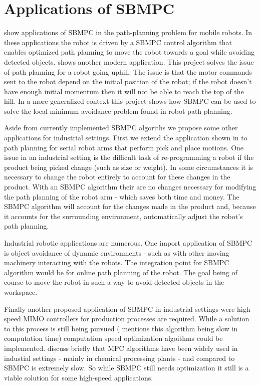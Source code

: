 \documentclass[main.tex]{subfile}
\begin{document}
\section{Applications of SBMPC} 
\label{sec:applications_of_sbmpc}

\cite{autoVehicle,auv} show applications of SBMPC in the path-planning problem
for mobile robots. In these applications the robot is driven by a SBMPC control
algorithm that enables optimized path planning to move the robot towards a goal
while avoiding detected objects. \cite{uphill} shows another modern application.
This project solves the issue of path planning for a robot going uphill. The
issue is that the motor commands sent to the robot depend on the initial
position of the robot; if the robot doesn't have enough initial momentum then it
will not be able to reach the top of the hill. In a more generalized context
this project shows how SBMPC can be used to solve the local minimum avoidance
problem found in robot path planning.

Aside from currently implemented SBMPC algoriths we propose some other
applications for industrial settings. First we extend the application shown in
\cite{uphill} to path planning for serial robot arms that perform pick and place
motions. One issue in an industrial setting is the difficult task of
re-programming a robot if the product being picked change (such as size or
weight). In some circumstances it is necessary to change the robot entirely to
account for these changes in the product. With an SBMPC algorithm their are no
changes necessary for modifying the path planning of the robot arm - which saves
both time and money. The SBMPC algorithm will account for the changes made in
the product and, because it accounts for the surrounding environment,
automatically adjust the robot's path planning.

Industrial robotic applications are numerous. One import application of SBMPC is
object avoidance of dynamic environments - such as with other moving machinery
interacting with the robots. The integration point for SBMPC algorithm would be
for online path planning of the robot. The goal being of course to move the
robot in such a way to avoid detected objects in the workspace. 

Finally another proposed application of SBMPC in industrial settings were
high-speed MIMO controllers for production processes are required. While a
solution to this process is still being pursued (\cite{autoVehicle} mentions
this algorithm being slow in computation time) computation speed optimization
algoithms could be implemented. \cite{uphill,auv} discuss briefly that MPC
algorithms have been widely used in industial settings - mainly in chemical
processing plants - and compared to SBMPC is extremely slow. So while SBMPC
still needs optimization it still is a viable solution for some high-speed
applications. 

\end{document}
